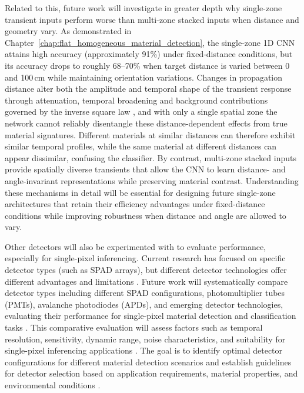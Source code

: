 \documentclass[12pt,a4paper,oneside]{report}
\begin{document}
Related to this, future work will investigate in greater depth why single-zone transient inputs perform worse than multi-zone stacked inputs when distance and geometry vary. As demonstrated in Chapter~\ref{chap:flat_homogeneous_material_detection}, the single-zone 1D CNN attains high accuracy (approximately 91\%) under fixed-distance conditions, but its accuracy drops to roughly 68--70\% when target distance is varied between 0 and 100\,cm while maintaining orientation variations. Changes in propagation distance alter both the amplitude and temporal shape of the transient response through attenuation, temporal broadening and background contributions governed by the inverse square law \cite{griffiths2017}, and with only a single spatial zone the network cannot reliably disentangle these distance-dependent effects from true material signatures. Different materials at similar distances can therefore exhibit similar temporal profiles, while the same material at different distances can appear dissimilar, confusing the classifier. By contrast, multi-zone stacked inputs provide spatially diverse transients that allow the CNN to learn distance- and angle-invariant representations while preserving material contrast. Understanding these mechanisms in detail will be essential for designing future single-zone architectures that retain their efficiency advantages under fixed-distance conditions while improving robustness when distance and angle are allowed to vary.

Other detectors will also be experimented with to evaluate performance, especially for single-pixel inferencing. Current research has focused on specific detector types (such as SPAD arrays), but different detector technologies offer different advantages and limitations \cite{piron2020}. Future work will systematically compare detector types including different SPAD configurations, photomultiplier tubes (PMTs), avalanche photodiodes (APDs), and emerging detector technologies, evaluating their performance for single-pixel material detection and classification tasks \cite{piron2020,itzler2011}. This comparative evaluation will assess factors such as temporal resolution, sensitivity, dynamic range, noise characteristics, and suitability for single-pixel inferencing applications \cite{koerner2021}. The goal is to identify optimal detector configurations for different material detection scenarios and establish guidelines for detector selection based on application requirements, material properties, and environmental conditions \cite{becker2023,tafone2023}.
\end{document}
